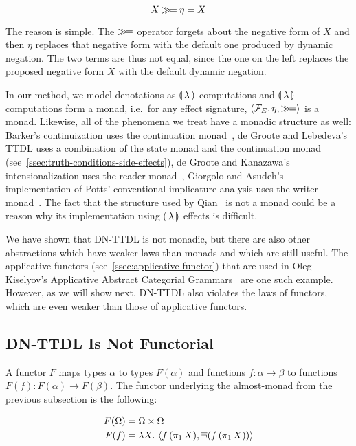 $$
X \mathbin{\gg\!=} \eta = X
$$
 
The reason is simple. The $\mathbin{\gg\!=}$ operator forgets about the negative
form of $X$ and then $\eta$ replaces that negative form with the default
one produced by dynamic negation. The two terms are thus not equal, since
the one on the left replaces the proposed negative form $X$ with the
default dynamic negation.

In our method, we model denotations as $\llparenthesis \, \lambda \, \rrparenthesis$ computations and
$\llparenthesis \, \lambda \, \rrparenthesis$ computations form a monad, i.e.\ for any effect
signature, $\left<\mathcal{F}_E, \eta, \mathbin{\gg\!=}\right>$ is a monad. Likewise, all of
the phenomena we treat have a monadic structure as well: Barker's
continuization uses the continuation monad~\cite{barker2002continuations},
de Groote and Lebedeva's TTDL uses a combination of the state monad and the
continuation monad~\cite{de2006towards,lebedeva2012expression}
(see~\ref{ssec:truth-conditions-side-effects}), de Groote and Kanazawa's
intensionalization uses the reader monad~\cite{de2013note}, Giorgolo and
Asudeh's implementation of Potts' conventional implicature analysis uses
the writer monad~\cite{giorgolo2011multidimensional}. The fact that the
structure used by Qian~\cite{qian2014accessibility} is not a monad could be
a reason why its implementation using $\llparenthesis \, \lambda \, \rrparenthesis$ effects is
difficult.

We have shown that DN-TTDL is not monadic, but there are also other
abstractions which have weaker laws than monads and which are still
useful. The applicative functors (see~\ref{ssec:applicative-functor}) that
are used in Oleg Kiselyov's Applicative Abstract Categorial
Grammars~\cite{kiselyov2015applicative,kiselyov2015swing} are one such
example. However, as we will show next, DN-TTDL also violates the laws of
functors, which are even weaker than those of applicative functors.


\subsection{DN-TTDL Is Not Functorial}

A functor $F$ maps types $\alpha$ to types $F(\alpha)$ and functions
$f : \alpha \to \beta$ to functions $F(f) : F(\alpha) \to F(\beta)$. The
functor underlying the almost-monad from the previous subsection is the
following:

\begin{align*}
  F(\Omega) &= \Omega \times \Omega \\
  F(f) &= \lambda X.\, \left< f\,(\pi_1\,X), \mathop{\overline{\lnot}}(f\,(\pi_1\,X)) \right>
\end{align*}

